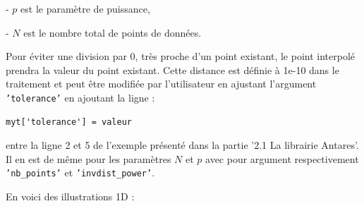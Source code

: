 - \(p\) est le paramètre de puissance,

- \(N\) est le nombre total de points de données.

\vspace*{0,5cm}

Pour éviter une division par 0, très proche d'un point existant, le point interpolé prendra la valeur du point existant. Cette distance est définie à 1e-10 dans le traitement et peut être modifiée par l'utilisateur en ajustant l'argument \texttt{'tolerance'} en ajoutant la ligne :
\begin{lstlisting}[]
    myt['tolerance'] = valeur
\end{lstlisting}
entre la ligne 2 et 5 de l'exemple présenté dans la partie '2.1 La librairie Antares'.
Il en est de même pour les paramètres \(N\) et \(p\) avec pour argument respectivement \texttt{'nb\_points'} et \texttt{'invdist\_power'}.


\vspace*{0,5cm}

\newpage

En voici des illustrations 1D :

